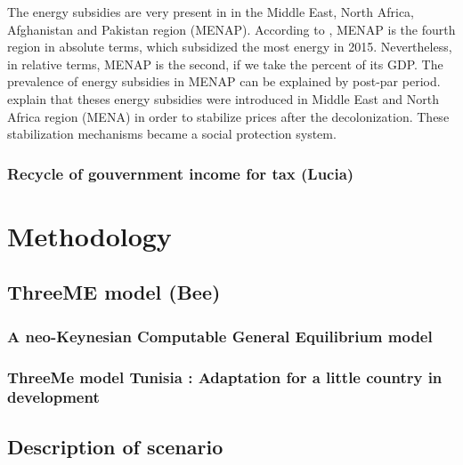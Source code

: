 \documentclass[
]{article}
\begin{document}
The energy subsidies are very present in in the Middle East, North
Africa, Afghanistan and Pakistan region (MENAP). According to
\textcite{coady2019}, MENAP is the fourth region in absolute terms,
which subsidized the most energy in 2015. Nevertheless, in relative
terms, MENAP is the second, if we take the percent of its GDP. The
prevalence of energy subsidies in MENAP can be explained by post-par
period. \textcite{verme2017} explain that theses energy subsidies were
introduced in Middle East and North Africa region (MENA) in order to
stabilize prices after the decolonization. These stabilization
mechanisms became a social protection system.

\hypertarget{recycle-of-gouvernment-income-for-tax-lucia}{%
\subsubsection{Recycle of gouvernment income for tax
(Lucia)}\label{recycle-of-gouvernment-income-for-tax-lucia}}

\hypertarget{methodology}{%
\section{Methodology}\label{methodology}}

\hypertarget{threeme-model-bee}{%
\subsection{ThreeME model (Bee)}\label{threeme-model-bee}}

\hypertarget{a-neo-keynesian-computable-general-equilibrium-model}{%
\subsubsection{A neo-Keynesian Computable General Equilibrium
model}\label{a-neo-keynesian-computable-general-equilibrium-model}}

\hypertarget{threeme-model-tunisia-adaptation-for-a-little-country-in-development}{%
\subsubsection{ThreeMe model Tunisia : Adaptation for a little country
in
development}\label{threeme-model-tunisia-adaptation-for-a-little-country-in-development}}

\hypertarget{description-of-scenario}{%
\subsection{Description of scenario}\label{description-of-scenario}}
\end{document}

